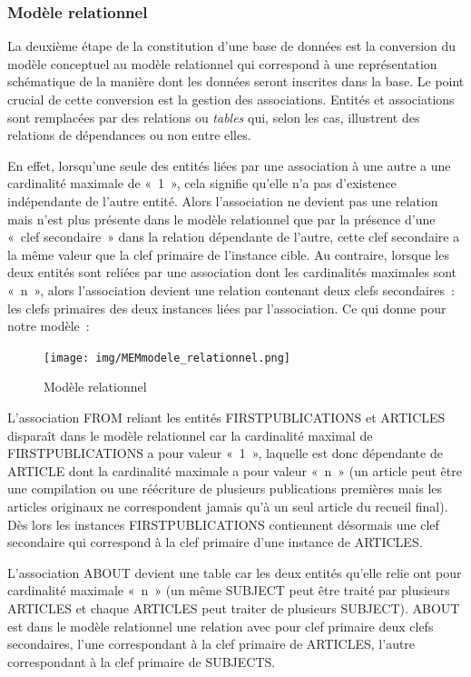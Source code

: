 \documentclass[12pt, a4paper]{article}
\begin{document}
\subsubsection{Modèle relationnel}
\label{ref:db_modele_relationnel}
La deuxième étape de la constitution d'une base de données est la conversion du modèle conceptuel au modèle relationnel qui correspond à une représentation schématique de la manière dont les données seront inscrites dans la base. Le point crucial de cette conversion est la gestion des associations. Entités et associations sont remplacées par des relations ou \textit{tables} qui, selon les cas, illustrent des relations de dépendances ou non entre elles.

En effet, lorsqu'une seule des entités liées par une association à une autre a une cardinalité maximale de «~1~», cela signifie qu'elle n'a pas d'existence indépendante de l'autre entité. Alors l'association ne devient pas une relation mais n'est plus présente dans le modèle relationnel que par la présence d'une «~clef secondaire~» dans la relation dépendante de l'autre, cette clef secondaire a la même valeur que la clef primaire de l'instance cible.
Au contraire, lorsque les deux entités sont reliées par une association dont les cardinalités maximales sont «~n~», alors l'association devient une relation contenant deux clefs secondaires~: les clefs primaires des deux instances liées par l'association. Ce qui donne pour notre modèle~:

\begin{figure}[H]
    \centering
    \texttt{[image: img/MEMmodele\_relationnel.png]}
    \caption{Modèle relationnel}
    \label{relationnel}
\end{figure}

L'association FROM reliant les entités FIRSTPUBLICATIONS et ARTICLES disparaît dans le modèle relationnel car la cardinalité maximal de FIRSTPUBLICATIONS a pour valeur «~1~», laquelle est donc dépendante de ARTICLE dont la cardinalité maximale a pour valeur «~n~» (un article peut être une compilation ou une réécriture de plusieurs publications premières mais les articles originaux ne correspondent jamais qu'à un seul article du recueil final). Dès lors les instances FIRSTPUBLICATIONS contiennent désormais une clef secondaire qui correspond à la clef primaire d'une instance de ARTICLES.

L'association ABOUT devient une table car les deux entités qu'elle relie ont pour cardinalité maximale «~n~» (un même SUBJECT peut être traité par plusieurs ARTICLES et chaque ARTICLES peut traiter de plusieurs SUBJECT). ABOUT est dans le modèle relationnel une relation avec pour clef primaire deux clefs secondaires, l'une correspondant à la clef primaire de ARTICLES, l'autre correspondant à la clef primaire de SUBJECTS.
\end{document}
